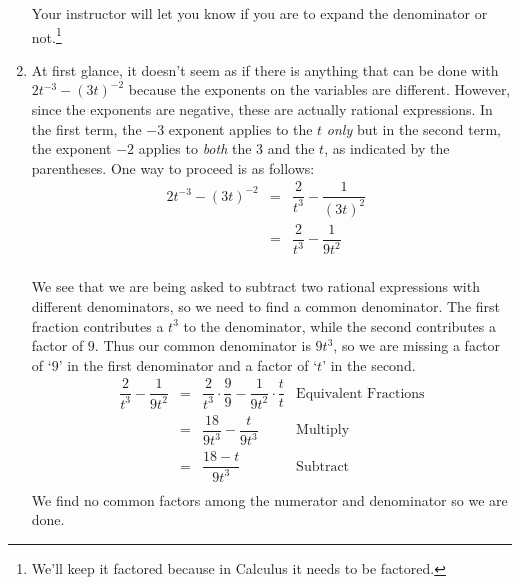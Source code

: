 \begin{ex}
\begin{enumerate}
Your instructor will let you know if you are to expand the denominator or not.\footnote{We'll keep it factored because in Calculus it needs to be factored.}

\item  At first glance, it doesn't seem as if there is anything that can be done with $2t^{-3} - (3t)^{-2}$ because the exponents on the variables are different.  However, since the exponents are negative, these are actually rational expressions.  In the first term, the $-3$ exponent applies to the $t$ \textit{only} but in the second term, the exponent $-2$ applies to \textit{both} the $3$ and the $t$, as indicated by the parentheses.  One way to proceed is as follows:\[ \begin{array}{rclr}

 2t^{-3} - (3t)^{-2} & = & \dfrac{2}{t^3} - \dfrac{1}{(3t)^2} & \\ [10pt]
                     & = & \dfrac{2}{t^3} - \dfrac{1}{9t^2} & \\ \end{array}\]
										
We see that we are being asked to subtract two rational expressions with different denominators, so we need to find a common denominator.  The first fraction contributes a $t^3$ to the denominator, while the second contributes a factor of $9$.  Thus our common denominator is $9t^3$, so we are missing a factor of `$9$' in the first denominator and a factor of `$t$' in the second. \[ \begin{array}{rclr}

 \dfrac{2}{t^3} - \dfrac{1}{9t^2} & = &  \dfrac{2}{t^3} \cdot \dfrac{9}{9} - \dfrac{1}{9t^2} \cdot \dfrac{t}{t} & \text{Equivalent Fractions} \\ [10pt]

                                  & = &  \dfrac{18}{9t^3} - \dfrac{t}{9t^3} & \text{Multiply}\\ [10pt]
																	
																	& = & \dfrac{18 - t}{9t^3} & \text{Subtract} \\ \end{array}\]
We find no common factors among the numerator and denominator so we are done.  


\end{enumerate}
\end{ex}
